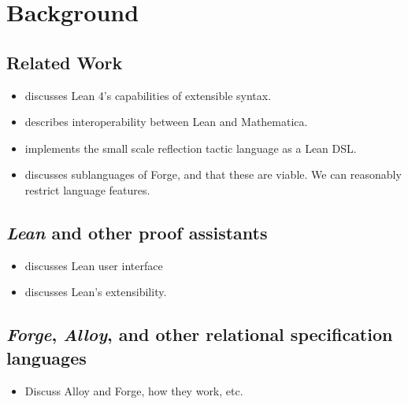 \section{Background}
\subsection{Related Work}
\begin{itemize}
    \item \cite{ullrich2022beyond} discusses Lean 4's capabilities of extensible syntax. 
    \item \cite{lewis2022bi} describes interoperability between Lean and Mathematica. 
    \item \cite{gladshtein2024small} implements the small scale reflection tactic language as a Lean DSL. 
    \item \cite{ngpdbccdlrrvwwk-oopsla-2024} discusses sublanguages of Forge, and that these are viable. We can reasonably restrict language features. 
\end{itemize}

\subsection{\emph{Lean} and other proof assistants}
\begin{itemize}
    \item \cite{nawrocki2023extensible} discusses Lean user interface
    \item \cite{moura2021lean} discusses Lean's extensibility. 
\end{itemize}

\subsection{\emph{Forge}, \emph{Alloy}, and other relational specification languages}
\begin{itemize}
    \item Discuss Alloy and Forge, how they work, etc. 
\end{itemize}
